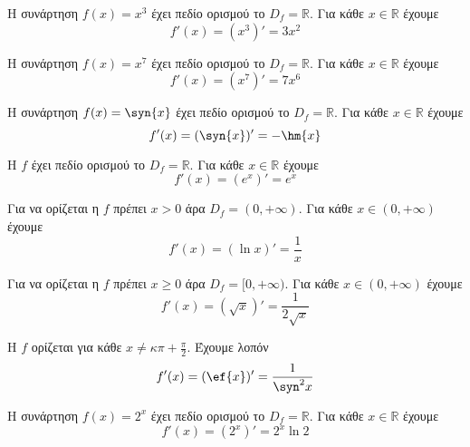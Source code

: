 \begin{alist}
\item Η συνάρτηση $ f(x)=x^3 $ έχει πεδίο ορισμού το $ D_f=\mathbb{R} $. Για κάθε $ x\in\mathbb{R} $ έχουμε
\[ f'(x)=(x^3)'=3x^2 \]
\item Η συνάρτηση $ f(x)=x^7 $ έχει πεδίο ορισμού το $ D_f=\mathbb{R} $. Για κάθε $ x\in\mathbb{R} $ έχουμε
\[ f'(x)=(x^7)'=7x^6 \]
\item Η συνάρτηση $ f(x)=\syn{x} $ έχει πεδίο ορισμού το $ D_f=\mathbb{R} $. Για κάθε $ x\in\mathbb{R} $ έχουμε
\[ f'(x)=(\syn{x})'=-\hm{x} \]
\item Η $ f $ έχει πεδίο ορισμού το $ D_f=\mathbb{R} $. Για κάθε $ x\in\mathbb{R} $ έχουμε
\[ f'(x)=(e^x)'=e^x \]
\item Για να ορίζεται η $ f $ πρέπει $ x>0 $ άρα $ D_f=(0,+\infty) $. Για κάθε $ x\in(0,+\infty) $ έχουμε
\[ f'(x)=(\ln{x})'=\dfrac{1}{x} \]
\item Για να ορίζεται η $ f $ πρέπει $ x\geq 0 $ άρα $ D_f=[0,+\infty) $. Για κάθε $ x\in(0,+\infty) $ έχουμε
\[ f'(x)=(\sqrt{x})'=\dfrac{1}{2\sqrt{x}} \]
\item Η $ f $ ορίζεται για κάθε $ x\neq\kappa\pi+\frac{\pi}{2} $. Έχουμε λοπόν
\[ f'(x)=(\ef{x})'=\dfrac{1}{\syn^2{x}} \]
\item Η συνάρτηση $ f(x)=2^x $ έχει πεδίο ορισμού το $ D_f=\mathbb{R} $. Για κάθε $ x\in\mathbb{R} $ έχουμε
\[ f'(x)=(2^x)'=2^x\ln{2} \]
\end{alist}

